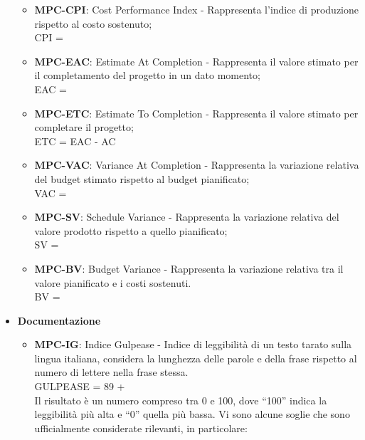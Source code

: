 \begin{itemize}
\begin{itemize}
            \item \textbf{MPC-CPI}: Cost Performance Index - Rappresenta l'indice di produzione rispetto al costo sostenuto;\\
                CPI = \\
            \item \textbf{MPC-EAC}: Estimate At Completion - Rappresenta il valore stimato per il completamento del progetto in un dato momento;\\
                EAC = \\ 
            \item \textbf{MPC-ETC}: Estimate To Completion - Rappresenta il valore stimato per completare il progetto;\\
                ETC = EAC - AC\\
            \item \textbf{MPC-VAC}: Variance At Completion - Rappresenta la variazione relativa del budget stimato rispetto al budget pianificato;\\
                VAC = \\
            \item \textbf{MPC-SV}: Schedule Variance - Rappresenta la variazione relativa del valore prodotto rispetto a quello pianificato;\\
                SV = \\
            \item \textbf{MPC-BV}: Budget Variance - Rappresenta la variazione relativa tra il valore pianificato e i costi sostenuti.\\
                BV = \\
        \end{itemize}
    \item \textbf{Documentazione}
        \begin{itemize}
            \item \textbf{MPC-IG}: Indice Gulpease - Indice di leggibilità di un testo tarato sulla lingua italiana, considera la lunghezza delle parole e della frase rispetto al numero di lettere nella frase stessa.\\
                GULPEASE = 89 + \\
                Il risultato è un numero compreso tra 0 e 100, dove ``100'' indica la leggibilità più alta e ``0'' quella più bassa. Vi sono alcune soglie che sono ufficialmente considerate rilevanti, in particolare:

\end{itemize}
\end{itemize}

